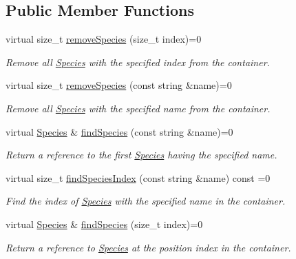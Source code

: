 \subsection*{Public Member Functions}
\begin{DoxyCompactItemize}
\item 
virtual size\+\_\+t \hyperlink{classSpeciesContainerIFace_a6ee46dc4246bcc68e74bc628dae79f08}{remove\+Species} (size\+\_\+t index)=0
\begin{DoxyCompactList}\small\item\em Remove all \hyperlink{classSpecies}{Species} with the specified index from the container. \end{DoxyCompactList}\item 
virtual size\+\_\+t \hyperlink{classSpeciesContainerIFace_a8909680d58ea288f4aa4ef7d177446ee}{remove\+Species} (const string \&name)=0
\begin{DoxyCompactList}\small\item\em Remove all \hyperlink{classSpecies}{Species} with the specified name from the container. \end{DoxyCompactList}\item 
virtual \hyperlink{classSpecies}{Species} \& \hyperlink{classSpeciesContainerIFace_abcd9a5f6a32c957c07afbc2c3cccec62}{find\+Species} (const string \&name)=0
\begin{DoxyCompactList}\small\item\em Return a reference to the first \hyperlink{classSpecies}{Species} having the specified name. \end{DoxyCompactList}\item 
virtual size\+\_\+t \hyperlink{classSpeciesContainerIFace_aeb3bef4a9510ed94aecf3a8c5dad161e}{find\+Species\+Index} (const string \&name) const =0
\begin{DoxyCompactList}\small\item\em Find the index of \hyperlink{classSpecies}{Species} with the specified name in the container. \end{DoxyCompactList}\item 
virtual \hyperlink{classSpecies}{Species} \& \hyperlink{classSpeciesContainerIFace_a91f57b7fff89426be885de142c03f09f}{find\+Species} (size\+\_\+t index)=0
\begin{DoxyCompactList}\small\item\em Return a reference to \hyperlink{classSpecies}{Species} at the position index in the container. \end{DoxyCompactList}\item 

\end{DoxyCompactItemize}
